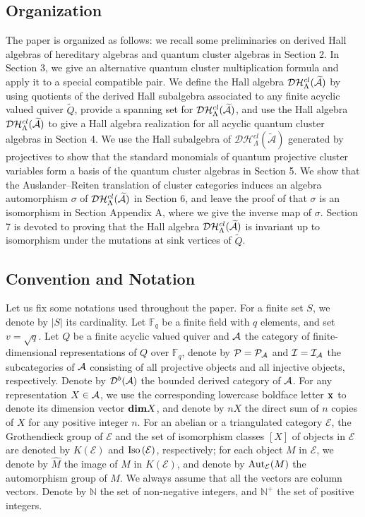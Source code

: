\documentclass[reqno,12pt]{amsart}
\numberwithin{equation}{section}
\def\P{\mathcal{P}}\def\I{\mathcal{I}}\def\X{\mathbb X}\def\T{\mathbb T}\def\e{\mbox{\rm e}}
\theoremstyle{plain} %
\theoremstyle{definition} %
\begin{document}
\subsection{Organization} The paper is organized as follows: we recall some preliminaries on derived Hall algebras of hereditary algebras and quantum
cluster algebras in Section 2. In Section 3, we give an alternative quantum cluster multiplication formula and apply it to a special compatible pair. We define the Hall algebra $\mathcal {D}\mathcal {H}_\Lambda^{{cl}}(\widetilde{\mathcal{A}})$
by using quotients of the derived Hall subalgebra associated to any finite acyclic valued quiver $\widetilde{Q}$, provide a spanning set for $\mathcal {D}\mathcal {H}_\Lambda^{{cl}}(\widetilde{\mathcal{A}})$, and use the Hall algebra $\mathcal {D}\mathcal {H}_\Lambda^{{cl}}(\widetilde{\mathcal{A}})$ to give a Hall algebra realization for all acyclic quantum cluster algebras in Section 4. We use the Hall subalgebra of $\mathcal{D}\mathcal{H}_\Lambda^{cl}(\widetilde{\mathcal{A}})$ generated by projectives to show that the standard monomials of quantum projective cluster variables form a basis of the quantum cluster algebras in Section 5.
We show that the Auslander--Reiten translation of cluster categories induces an algebra automorphism $\sigma$ of $\mathcal {D}\mathcal {H}_\Lambda^{{cl}}(\widetilde{\mathcal{A}})$ in Section 6, and leave the proof of that $\sigma$ is an isomorphism in Section Appendix A, where we give the inverse map of $\sigma$. Section 7 is devoted to proving that the Hall algebra $\mathcal {D}\mathcal {H}_\Lambda^{{cl}}(\widetilde{\mathcal{A}})$ is invariant up to isomorphism under the mutations at sink vertices of $\widetilde{Q}$.


\subsection{Convention and Notation} Let us fix some notations used throughout the paper. For a finite set $S$, we denote by $|S|$ its cardinality. Let $\mathbb{F}_q$ be a finite field with $q$ elements, and set $v=\sqrt{q}$. Let $Q$ be a finite acyclic valued quiver and $\mathcal{A}$ the category of finite-dimensional representations of $Q$ over $\mathbb{F}_q$, denote by $\P=\mathcal {P}_{\A}$ and $\I=\mathcal {I}_{\A}$ the subcategories of $\mathcal{A}$ consisting of all projective objects and all injective objects, respectively. Denote by $\mathcal{D}^b(\mathcal{A})$ the bounded derived category of $\mathcal{A}$. For any representation $X\in\mathcal{A}$, we use the corresponding lowercase boldface letter ${\bf x}$ to denote its dimension vector $\mbox{\rm \textbf{dim}} X$, and denote by $nX$ the direct sum of $n$ copies of $X$ for any positive integer $n$. For an abelian or a triangulated category $\mathcal {E}$, the Grothendieck group of $\mathcal {E}$ and the set of isomorphism classes $[X]$ of objects in $\mathcal {E}$ are denoted by $K(\mathcal {E})$ and $\mbox{\rm Iso}\,(\mathcal {E})$, respectively; for each object $M$ in $\mathcal {E}$, we denote by $\hat{M}$ the image of $M$ in $K(\mathcal {E})$, and denote by ${\rm Aut}_{\mathcal {E}} (M)$ the automorphism group of $M$.
We always assume that all the vectors are column vectors. Denote by $\mathbb{N}$ the set of non-negative integers, and $\mathbb{N}^+$ the set of positive integers.
\end{document}
